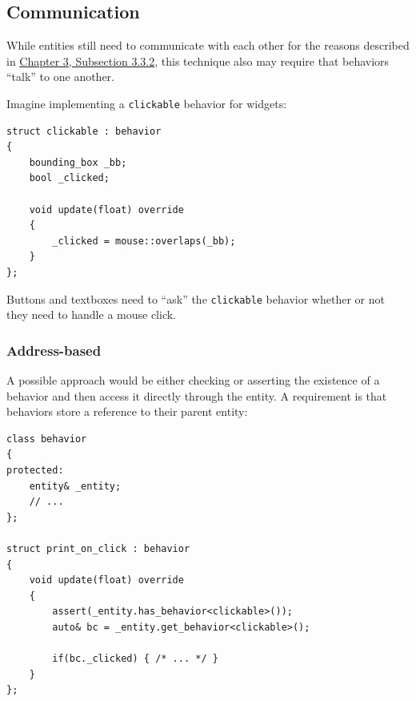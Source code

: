 \documentclass[twoside, 12pt, a4paper, openany]{book}
\begin{document}
\subsection{Communication}\label{communication}

While entities still need to communicate with each other for the reasons
described in \protect\hyperlink{chapter_oop_communication}{Chapter 3,
Subsection 3.3.2}, this technique also may require that behaviors
``talk'' to one another.

Imagine implementing a
\texttt{clickable}
behavior for widgets:

\begin{verbatim}
struct clickable : behavior
{
    bounding_box _bb;
    bool _clicked;

    void update(float) override
    {
        _clicked = mouse::overlaps(_bb);
    }
};
\end{verbatim}

Buttons and textboxes need to ``ask'' the
\texttt{clickable}
behavior whether or not they need to handle a mouse click.

\subsubsection{Address-based}\label{address-based-1}

A possible approach would be either checking or asserting the existence
of a behavior and then access it directly through the entity. A
requirement is that behaviors store a reference to their parent entity:

\begin{verbatim}
class behavior
{
protected:
    entity& _entity;
    // ...
};

struct print_on_click : behavior
{
    void update(float) override
    {
        assert(_entity.has_behavior<clickable>());
        auto& bc = _entity.get_behavior<clickable>();

        if(bc._clicked) { /* ... */ }
    }
};
\end{verbatim}
\end{document}
